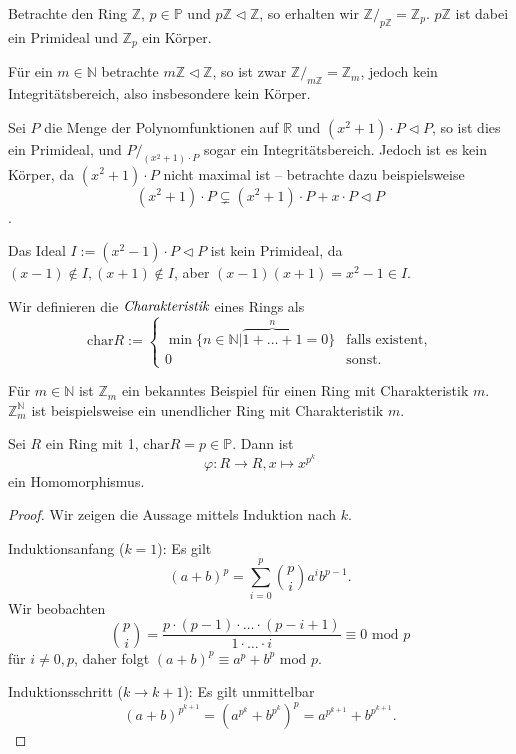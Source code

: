 
\begin{example}
    Betrachte den Ring $\mathbb{Z}$, $p \in \mathbb{P}$ und $p \mathbb{Z} \vartriangleleft \mathbb{Z}$, so erhalten wir $\mathbb{Z}/_{p\mathbb{Z}} = \mathbb{Z}_p$.
    $p\mathbb{Z}$ ist dabei ein Primideal und $\mathbb{Z}_p$ ein Körper.

    Für ein $m \in \mathbb{N}$ betrachte $m \mathbb{Z} \vartriangleleft \mathbb{Z}$, so ist zwar $\mathbb{Z} /_{m\mathbb{Z}} = \mathbb{Z}_m$, jedoch kein Integritätsbereich,
    also insbesondere kein Körper.
\end{example}

\begin{example}
    Sei $P$ die Menge der Polynomfunktionen auf $\mathbb{R}$ und $(x^2+1) \cdot P \vartriangleleft P$, so ist dies ein Primideal, und $P/_{(x^2+1) \cdot P}$ sogar ein Integritätsbereich. Jedoch ist es kein Körper, da $(x^2+1) \cdot P$ nicht maximal ist -- betrachte dazu beispielsweise
    $$ (x^2 + 1) \cdot P \subsetneq (x^2+1) \cdot P + x \cdot P \vartriangleleft P $$.

    Das Ideal $I := (x^2 - 1) \cdot P \vartriangleleft P$ ist kein Primideal, da $(x-1)\notin I, (x+1) \notin I$, aber $(x-1)(x+1) = x^2 - 1 \in I$.
\end{example}

\begin{definition}
    Wir definieren die $\emph{Charakteristik}$ eines Rings als
    $$ \mathrm{char}{R} := 
    \begin{cases}
        \min\{n\in\mathbb{N}|\overbrace{1+\ldots+1}^n=0\} & \text{falls existent,}\\
        0 & \text{sonst}.
    \end{cases}
        $$
\end{definition}

\begin{example}
    Für $m\in\mathbb{N}$ ist $\mathbb{Z}_m$ ein bekanntes Beispiel für einen Ring mit Charakteristik $m$.
    $\mathbb{Z}_m^{\mathbb{N}}$ ist beispielsweise ein unendlicher Ring mit Charakteristik $m$.
\end{example}

\begin{proposition}
    Sei $R$ ein Ring mit 1, $\mathrm{char} R = p \in \mathbb{P}$. Dann ist
    $$ \varphi : R \to R, x \mapsto x^{p^k} $$
    ein Homomorphismus.
\end{proposition}

\begin{proof}
    Wir zeigen die Aussage mittels Induktion nach $k$.

    Induktionsanfang ($k = 1$): Es gilt
    $$ (a+b)^p = \sum_{i=0}^p {p \choose i} a^i b^{p-1}. $$
    Wir beobachten
    $$ {p \choose i} = \frac{p \cdot (p-1) \cdot \hdots \cdot (p-i+1)}{1\cdot \ldots \cdot i} \equiv 0 \text{ mod } p $$
    für $i\neq 0,p$, daher folgt $(a+b)^p\equiv a^p+b^p\text{ mod }p$.

    Induktionsschritt ($k\to k+1$): Es gilt unmittelbar
    $$(a+b)^{p^{k+1}}=(a^{p^k}+b^{p^k})^p=a^{p^{k+1}}+b^{p^{k+1}}.$$
\end{proof}

